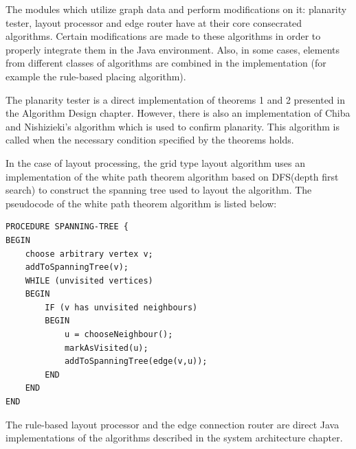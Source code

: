 The modules which utilize graph data and perform modifications on it: planarity tester, layout processor and edge router 
have at their core consecrated algorithms. Certain modifications are made to these algorithms in order to properly integrate 
them in the Java environment. Also, in some cases, elements from different classes of algorithms are combined in the 
implementation (for example the rule-based placing algorithm).

The planarity tester is a direct implementation of theorems 1 and 2 presented in the Algorithm Design chapter. However, there 
is also an implementation of Chiba and Nishizieki's algorithm which is used to confirm planarity. This algorithm is called 
when the necessary condition specified by the theorems holds.

In the case of layout processing, the grid type layout algorithm uses an implementation of the white path theorem algorithm 
based on DFS(depth first search) to construct the spanning tree used to layout the algorithm. The pseudocode of the white path 
theorem algorithm is listed below:

\begin{lstlisting}[caption=Spanning tree algorithm using DFS]
PROCEDURE SPANNING-TREE {
BEGIN
	choose arbitrary vertex v;
	addToSpanningTree(v);
	WHILE (unvisited vertices)
	BEGIN
		IF (v has unvisited neighbours)
		BEGIN
			u = chooseNeighbour();
			markAsVisited(u);
			addToSpanningTree(edge(v,u));
		END
	END
END
\end{lstlisting}

The rule-based layout processor and the edge connection router are direct Java implementations of the algorithms described 
in the system architecture chapter.

